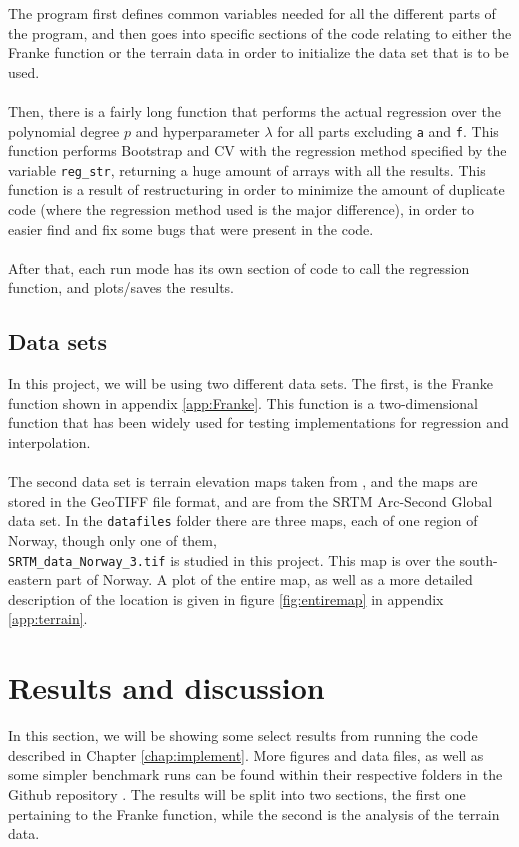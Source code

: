 \documentclass[a4paper]{article}
\begin{document}
The program first defines common variables needed for all the different parts of the program, and then goes into specific sections of the code relating to either the Franke function or the terrain data in order to initialize the data set that is to be used.
\\\\
Then, there is a fairly long function that performs the actual regression over the polynomial degree $p$ and hyperparameter $\lambda$ for all parts excluding \texttt{a} and \texttt{f}. This function performs Bootstrap and CV with the regression method specified by the variable \texttt{reg\_str}, returning a huge amount of arrays with all the results. This function is a result of restructuring in order to minimize the amount of duplicate code (where the regression method used is the major difference), in order to easier find and fix some bugs that were present in the code.
\\\\
After that, each run mode has its own section of code to call the regression function, and plots/saves the results.

\subsection{Data sets} \label{sec:data_sets}
In this project, we will be using two different data sets. The first, is the Franke function shown in appendix \ref{app:Franke}. This function is a two-dimensional function that has been widely used for testing implementations for regression and interpolation.
\\\\
The second data set is terrain elevation maps taken from \cite{terrain}, and the maps are stored in the GeoTIFF file format, and are from the SRTM Arc-Second Global data set. In the \texttt{datafiles} folder there are three maps, each of one region of Norway, though only one of them, \\\texttt{SRTM\_data\_Norway\_3.tif} is studied in this project. This map is over the south-eastern part of Norway. A plot of the entire map, as well as a more detailed description of the location is given in figure \ref{fig:entiremap} in appendix \ref{app:terrain}.
\section{Results and discussion} \label{chap:results}
In this section, we will be showing some select results from running the code described in Chapter \ref{chap:implement}. More figures and data files, as well as some simpler benchmark runs can be found within their respective folders in the Github repository \cite{Github1}. The results will be split into two sections, the first one pertaining to the Franke function, while the second is the analysis of the terrain data.
\end{document}
